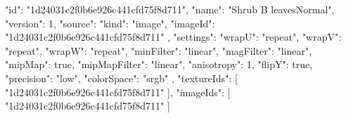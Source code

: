 {
  "id": "1d24031c2f0b6e926c441cfd75f8d711",
  "name": "Shrub B leavesNormal",
  "version": 1,
  "source": {
    "kind": "image",
    "imageId": "1d24031c2f0b6e926c441cfd75f8d711"
  },
  "settings": {
    "wrapU": "repeat",
    "wrapV": "repeat",
    "wrapW": "repeat",
    "minFilter": "linear",
    "magFilter": "linear",
    "mipMap": true,
    "mipMapFilter": "linear",
    "anisotropy": 1,
    "flipY": true,
    "precision": "low",
    "colorSpace": "srgb"
  },
  "textureIds": [
    "1d24031c2f0b6e926c441cfd75f8d711"
  ],
  "imageIds": [
    "1d24031c2f0b6e926c441cfd75f8d711"
  ]
}
